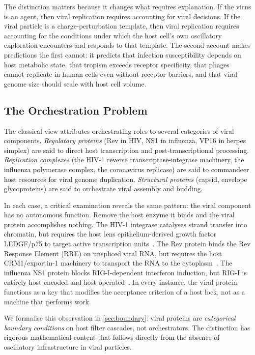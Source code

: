 \documentclass[11pt,twocolumn,a4paper]{article}
\theoremstyle{definition}
\theoremstyle{remark}
\begin{document}
The distinction matters because it changes what requires explanation. If the virus is an agent, then viral replication requires accounting for viral decisions. If the viral particle is a charge-perturbation template, then viral replication requires accounting for the conditions under which the host cell's own oscillatory exploration encounters and responds to that template. The second account makes predictions the first cannot: it predicts that infection susceptibility depends on host metabolic state, that tropism exceeds receptor specificity, that phages cannot replicate in human cells even without receptor barriers, and that viral genome size should scale with host cell volume.

\subsection{The Orchestration Problem}

The classical view attributes orchestrating roles to several categories of viral components. \textit{Regulatory proteins} (Rev in HIV, NS1 in influenza, VP16 in herpes simplex) are said to direct host transcription and post-transcriptional processing. \textit{Replication complexes} (the HIV-1 reverse transcriptase-integrase machinery, the influenza polymerase complex, the coronavirus replicase) are said to commandeer host resources for viral genome duplication. \textit{Structural proteins} (capsid, envelope glycoproteins) are said to orchestrate viral assembly and budding.

In each case, a critical examination reveals the same pattern: the viral component has no autonomous function. Remove the host enzyme it binds and the viral protein accomplishes nothing. The HIV-1 integrase catalyses strand transfer into chromatin, but requires the host lens epithelium-derived growth factor LEDGF/p75 to target active transcription units~\cite{Engelman2012}. The Rev protein binds the Rev Response Element (RRE) on unspliced viral RNA, but requires the host CRM1/exportin-1 machinery to transport the RNA to the cytoplasm~\cite{Malim1989}. The influenza NS1 protein blocks RIG-I-dependent interferon induction, but RIG-I is entirely host-encoded and host-operated~\cite{Gack2009}. In every instance, the viral protein functions as a key that modifies the acceptance criterion of a host lock, not as a machine that performs work.

We formalise this observation in \cref{sec:boundary}: viral proteins are \emph{categorical boundary conditions} on host filter cascades, not orchestrators. The distinction has rigorous mathematical content that follows directly from the absence of oscillatory infrastructure in viral particles.
\end{document}

